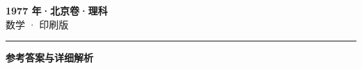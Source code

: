 \documentclass[zihao=5, a4paper]{ctexart}
\begin{document}
\begin{center}
  {\Large\bfseries 1977 年·北京卷·理科}\\[4pt]
  {\large 数学 · 印刷版}
\end{center}
\medskip
{}

\par\bigskip\hrule\bigskip
{}
\begin{center}{\large\bfseries 参考答案与详细解析}\end{center}
\smallskip

\end{document}
